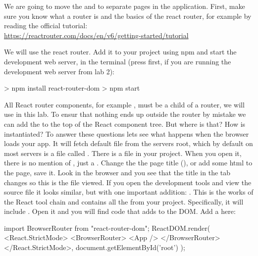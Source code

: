 \documentclass[fleqn, article, a4paper]{memoir}
\begin{document}
\begin{Assignments}

\item We are going to move the  and  to separate pages in the application. First, make sure you know what a router is and the basics of the react router, for example by reading the official tutorial: 
\\ \url{https://reactrouter.com/docs/en/v6/getting-started/tutorial}

\item We will use the react router. Add it to your project using npm and start the development web server, in the terminal (press  first, if you are running the development web server from lab 2):
\begin{Code}
> npm install react-router-dom
> npm start
\end{Code}

\item All React router components, for example , must be a child of a router, we will use  in this lab. To ensur that nothing ends up outside the router by mistake we can add the  to the top of the React component tree. But where is that? How is  instantiated? To answer these questions lets see what happens when the browser loads your app. It will fetch default file from the servers root, which by default on most servers is a file called  . There is a  file in your project. When you open it, there is no mention of , just a . Change the the page title (), or add some html to the page, save it. Look in the browser and you see that the title in the tab changes so this is the file viewed. If you open the development tools and view the source file it looks similar, but with one important addition: . This is the works of the React tool chain and  contains all the from your project. Specifically, it will include . Open it and you will find code that adds  to the DOM. Add a  here:

\begin{Code}
import { BrowserRouter } from "react-router-dom";
ReactDOM.render(
  <React.StrictMode>
    <BrowserRouter>
      <App />
    </BrowserRouter>
  </React.StrictMode>,
  document.getElementById('root')
);
\end{Code}


\end{Assignments}
\end{document}

